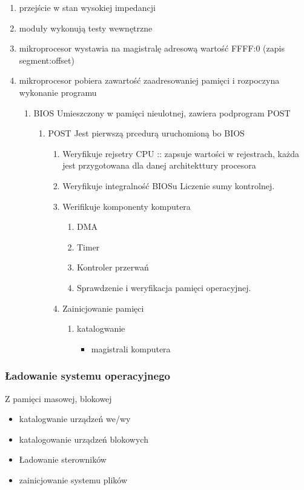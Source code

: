 \documentclass[11pt]{article}
\begin{document}
\begin{enumerate}
\item przejście w stan wysokiej impedancji
\label{sec:orgc360e23}
\item moduły wykonują testy wewnętrzne
\label{sec:org1ade9c5}
\item mikroprocesor wystawia na magistralę adresową wartość FFFF:0 (zapis segment:offset)
\label{sec:org5ed411d}
\item mikroprocesor pobiera zawartość zaadresowaniej pamięci i rozpoczyna wykonanie programu
\label{sec:org35132eb}
\begin{enumerate}
\item BIOS
\label{sec:org43cb3e4}
Umieszczony w pamięci nieulotnej, zawiera podprogram POST
\begin{enumerate}
\item POST
\label{sec:orga429f8f}
Jest pierwszą prcedurą uruchomioną bo BIOS
\begin{enumerate}
\item Weryfikuje rejsetry CPU :: zapsuje wartości w rejestrach, każda jest przygotowana dla danej architekttury procesora
\label{sec:org819f2d9}
\item Weryfikuje integralność BIOSu
\label{sec:orgcb404cf}
Liczenie sumy kontrolnej.
\item Werifikuje komponenty komputera
\label{sec:org2d9c6e1}
\begin{enumerate}
\item DMA
\label{sec:orgb570be2}
\item Timer
\label{sec:orgaf46ed6}
\item Kontroler przerwań
\label{sec:orgad6f1ea}
\item Sprawdzenie i weryfikacja pamięci operacyjnej.
\label{sec:org59d7996}
\end{enumerate}
\item Zainicjowanie pamięci
\label{sec:org13eed5b}
\begin{enumerate}
\item katalogwanie
\label{sec:org2787c60}
\begin{itemize}
\item magistrali komputera
\end{itemize}
\end{enumerate}
\end{enumerate}
\end{enumerate}
\end{enumerate}
\end{enumerate}
\subsubsection{Ładowanie systemu operacyjnego}
\label{sec:org2d2d93a}
Z pamięci masowej, blokowej
\begin{itemize}
\item katalogwanie urządzeń we/wy
\item katalogowanie urządzeń blokowych
\item Ładowanie sterowników
\item zainicjowanie systemu plików
\end{itemize}
\end{document}

